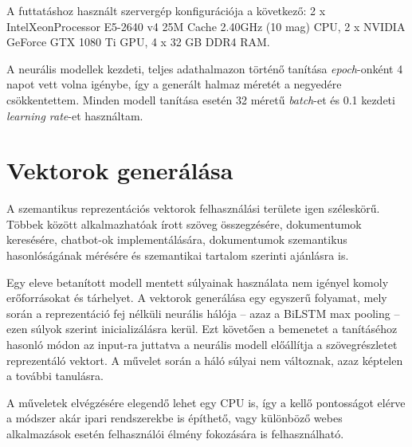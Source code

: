 A futtatáshoz használt szervergép konfigurációja a következő: 2 x Intel\textregistered Xeon\textregistered  Processor E5-2640 v4 25M Cache 2.40GHz (10 mag) CPU, 2 x NVIDIA GeForce GTX 1080 Ti GPU, 4 x 32 GB DDR4 RAM.

A neurális modellek kezdeti, teljes adathalmazon történő tanítása \textit{epoch}-onként 4 napot vett volna igénybe, így a generált halmaz méretét a negyedére csökkentettem. Minden modell tanítása esetén 32 méretű \textit{batch}-et és 0.1 kezdeti \textit{learning rate}-et használtam. 


\section{Vektorok generálása}

A szemantikus reprezentációs vektorok felhasználási területe igen széleskörű. Többek között alkalmazhatóak írott szöveg összegzésére, dokumentumok keresésére, chatbot-ok implementálására, dokumentumok szemantikus hasonlóságának mérésére és szemantikai tartalom szerinti ajánlásra is.

Egy eleve betanított modell mentett súlyainak használata nem igényel komoly erőforrásokat és tárhelyet. A vektorok generálása egy egyszerű folyamat, mely során a reprezentáció fej nélküli neurális hálója – azaz a BiLSTM max pooling – ezen súlyok szerint inicializálásra kerül. Ezt követően a bemenetet a tanításéhoz hasonló módon az input-ra juttatva a neurális modell előállítja a szövegrészletet reprezentáló vektort. A művelet során a háló súlyai nem változnak, azaz képtelen a további tanulásra.

A műveletek elvégzésére elegendő lehet egy CPU is, így a kellő pontosságot elérve a módszer akár ipari rendszerekbe is építhető, vagy különböző webes alkalmazások esetén felhasználói élmény fokozására is felhasználható.


